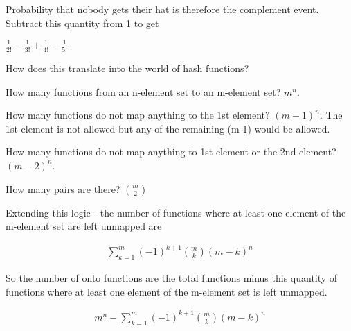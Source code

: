 \documentclass[12pt]{article}
\begin{document}
Probability that nobody gets their hat is therefore the complement event. Subtract this quantity from 1 to get

$\frac{1}{2!} - \frac{1}{3!} + \frac{1}{4!} - \frac{1}{5!}$

\medskip

How does this translate into the world of hash functions?

How many functions from an n-element set to an m-element set? $m^n$.

How many functions do not map anything to the 1st element? $(m-1)^n$. The 1st element is not allowed but any of the remaining (m-1) would be allowed. 

How many functions do not map anything to 1st element or the 2nd element? $(m-2)^n$. 

How many pairs are there? ${m \choose 2}$

Extending this logic - the number of functions where at least one element of the m-element set are left unmapped  are 

\begin{align*}
\sum_{k=1}^m (-1)^{k+1} {m \choose k} (m-k)^n
\end{align*}

So the number of onto functions are the total functions minus this quantity of functions where at least one element of the m-element set is left unmapped. 

\begin{align*}
m^n - \sum_{k=1}^m (-1)^{k+1} {m \choose k} (m-k)^n
\end{align*}
\end{document}
